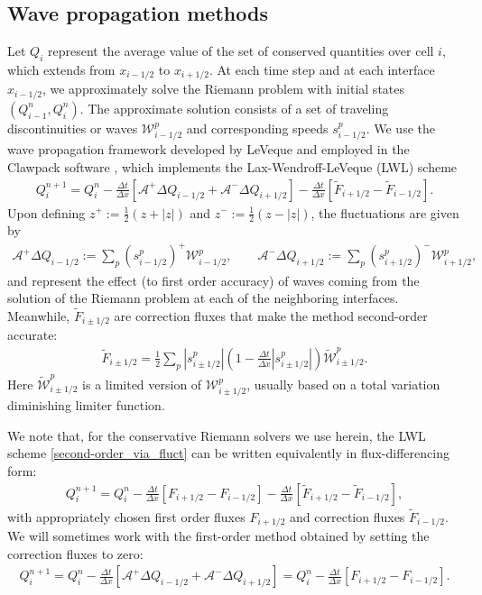 \documentclass[preprint, 11pt]{article}
\newcommand{\W}{{\mathcal W}}
\newcommand{\A}{{\mathcal A}}
\newcommand{\apdq}{\A^+ \!\!{\Delta} Q}
\newcommand{\amdq}{\A^- \!\!{\Delta} Q}
\newcommand{\Ft}{\tilde{F}}
\newcommand{\imh}{{i-1/2}}
\newcommand{\iph}{{i+1/2}}
\newcommand{\bfF}{{F}}
\begin{document}
\subsection{Wave propagation methods}\label{sec:waveprop}
Let $Q_i$ represent the average value of the set of
conserved quantities over cell $i$, which extends from $x_\imh$ to $x_\iph$.
At each time step and at each interface $x_\imh$, we approximately solve the
Riemann problem with initial states $(Q^n_{i-1},Q^n_i)$.  The approximate
solution consists of a set of traveling discontinuities or waves $\W^p_\imh$
and corresponding speeds $s^p_\imh$.
We use the wave propagation framework developed by LeVeque \cite{leveque1997wave, leveque2002finite}
and employed in the Clawpack software \cite{clawpack,pyclaw-sisc}, which implements the 
Lax-Wendroff-LeVeque (LWL) scheme
\begin{align}\label{second-order_via_fluct}
  Q_i^{n+1} = Q_i^n-\frac{\Delta t}{\Delta x}\left[\apdq_\imh+\amdq_\iph\right]
  -\frac{\Delta t}{\Delta x}\left[\tilde{F}_{i+1/2}-\tilde{F}_{i-1/2}\right].
\end{align}
Upon defining $z^+:=\frac{1}{2}(z+|z|)$ and $z^-:=\frac{1}{2}(z-|z|)$,
the fluctuations are given by
\begin{align}\label{fluct}
  \apdq_\imh := \sum_p\left(s_{i-1/2}^p\right)^+\W_{i-1/2}^p, \qquad
  \amdq_\iph := \sum_p\left(s_{i+1/2}^p\right)^-\W_{i+1/2}^p, 
\end{align}
and represent the effect (to first
order accuracy) of waves coming from the solution of the Riemann problem at
each of the neighboring interfaces.  Meanwhile, $\Ft_{i\pm 1/2}$ are correction
fluxes that make the method second-order accurate:
\begin{align}\label{correction-fluxes}
  \tilde{F}_{i\pm 1/2}=\frac{1}{2}\sum_p|s_{i\pm 1/2}^p|\left(1-\frac{\Delta t}{\Delta x}|s_{i\pm 1/2}^p|\right)\tilde\W_{i\pm 1/2}^p.
\end{align}
Here $\tilde{\W}_{i\pm 1/2}^p$ is a limited version of $\W_{i\pm 1/2}^p$, usually
based on a total variation diminishing limiter function.

We note that, for the conservative Riemann solvers we use herein, the LWL scheme
\eqref{second-order_via_fluct} can be written equivalently in flux-differencing
form:
\begin{align}\label{flux-differencing-form}
  Q_i^{n+1}=Q_i^n-\frac{\Delta t}{\Delta x}\left[\bfF_{i+1/2}-\bfF_{i-1/2}\right]
 -\frac{\Delta t}{\Delta x}\left[\tilde{F}_{i+1/2}-\tilde{F}_{i-1/2}\right],
\end{align}
with appropriately chosen first order fluxes $\bfF_{i+1/2}$ and correction
fluxes $\tilde{F}_{i-1/2}$.
We will sometimes work with
the first-order method obtained by setting the correction fluxes to zero:
\begin{align}\label{first-order_via_fluct}
  Q_i^{n+1} = Q_i^n-\frac{\Delta t}{\Delta x}\left[\apdq_\imh+\amdq_\iph\right]
 = Q_i^n -\frac{\Delta t}{\Delta x}\left[\bfF_{i+1/2}-\bfF_{i-1/2}\right].
\end{align}
\end{document}
